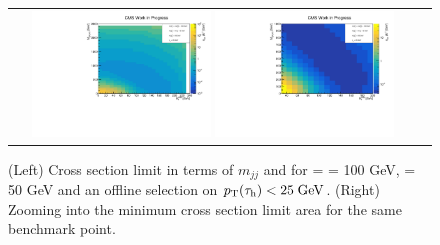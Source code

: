 \begin{figure}[tbh!]
	\centering
	\begin{tabular}{cc}
		\includegraphics[width=0.45\textwidth]{analysis/pics/JetInvMass_vs_MET_xsec_chi100_lsp050_taupt25.pdf}
		\includegraphics[width=0.45\textwidth]{analysis/pics/JetInvMass_vs_MET_xsec_chi100_lsp050_taupt25_zoom.pdf} 		
	\end{tabular}
	\caption{(Left) Cross section limit in terms of $m_{jj}$ and \met for \charginopm = \neutralinotwo = 100 GeV, \neutralinoone = 50 GeV and an offline selection on $p_{\text{T}}(\tau_{\text{h}}) <  25\;\text{Ge}\kern-0.06667em\text{V}$. (Right) Zooming into the minimum cross section limit area for the same benchmark point.}
	\label{fig::JetInvMass_vs_MET_xsec_chi100_lsp050_taupt25}
\end{figure}

